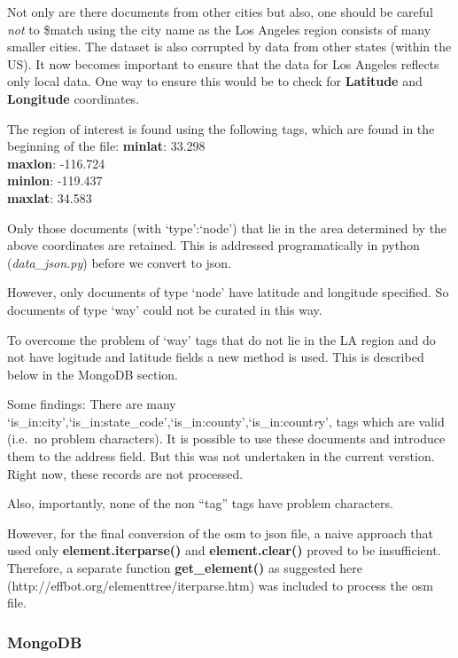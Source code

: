 \documentclass[12pt]{article}
\begin{document}
Not only are there documents from other cities but also, one should be
careful \emph{not} to \$match using the city name as the Los Angeles
region consists of many smaller cities. The dataset is also corrupted by
data from other states (within the US). It now becomes important to
ensure that the data for Los Angeles reflects only local data. One way
to ensure this would be to check for \textbf{Latitude} and
\textbf{Longitude} coordinates.

The region of interest is found using the following tags, which are
found in the beginning of the file: \textbf{minlat}:
33.298\\\textbf{maxlon}: -116.724\\\textbf{minlon}:
-119.437\\\textbf{maxlat}: 34.583

Only those documents (with `type':`node') that lie in the area
determined by the above coordinates are retained. This is addressed
programatically in python (\emph{data\_json.py}) before we convert to
json.

However, only documents of type `node' have latitude and longitude
specified. So documents of type `way' could not be curated in this way.

To overcome the problem of `way' tags that do not lie in the LA region
and do not have logitude and latitude fields a new method is used. This
is described below in the MongoDB section.

Some findings: There are many
`is\_in:city',`is\_in:state\_code',`is\_in:county',`is\_in:count\emph{r}y',
tags which are valid (i.e.~no problem characters). It is possible to use
these documents and introduce them to the address field. But this was
not undertaken in the current verstion. Right now, these records are not
processed.

Also, importantly, none of the non ``tag'' tags have problem characters.

However, for the final conversion of the osm to json file, a naive
approach that used only \textbf{element.iterparse()} and
\textbf{element.clear()} proved to be insufficient. Therefore, a
separate function \textbf{get\_element()} as suggested here
(http://effbot.org/elementtree/iterparse.htm) was included to process
the osm file.

\subsubsection{MongoDB}\label{mongodb}
\end{document}
